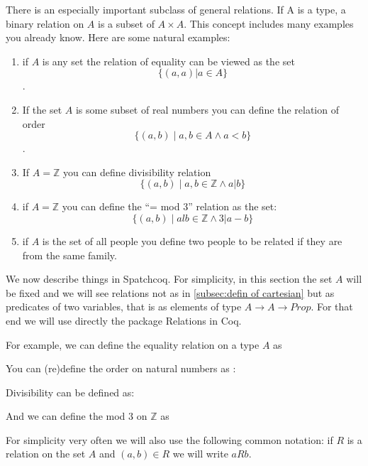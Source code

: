 There is an especially important subclass of general relations. If A is a type, a binary relation on $A$ is a subset of $A\times A$. This concept includes many examples you already know. Here are some natural examples:
\begin{enumerate}
\item  if $A$ is any set the relation of equality can be viewed as the set $$\{ (a,a) | a \in A\}$$.  
\item If the set $A$ is some subset of real numbers you can define the relation of order $$\{ (a, b) \mid a , b \in A \land a<b\}$$. 
\item If $A= \mathbb{Z}$ you can define divisibility  relation $$\{ (a, b) \mid a, b \in \mathbb{Z} \land  a | b \}$$
\item if $A= \mathbb{Z}$  you can define the ``= mod 3'' relation as the set:
$$\{(a, b) \mid alb \in \mathbb{Z} \land 3 | a-b \}$$
\item if $A$ is the set of all people you define two people to be related if they are from the same family.
\end{enumerate}
We now describe things in Spatchcoq. For simplicity, in this section the set $A$ will be fixed and we will see relations not as in \ref{subsec:defin of cartesian}  but as predicates of two variables, that is as elements of type $A \rightarrow A \rightarrow Prop$. For that end we will use directly the package Relations in Coq.


For example, we can define the equality relation on a  type $A$ as

You can (re)define  the order on natural numbers as :

Divisibility can be defined as:

And we can define the mod 3 on $\mathbb Z$ as



For simplicity very often we will also use the following common notation: if $R$ is a relation on the set $A$ and $(a,b)\in R$ we will write $a R b$.

